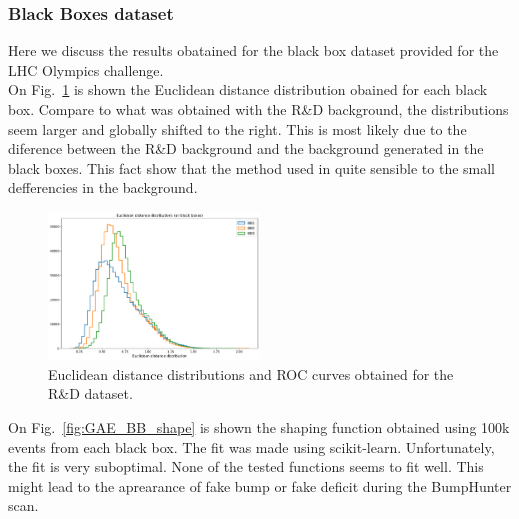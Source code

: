 \documentclass[letterpaper,11pt]{article}
\begin{document}
\subsubsection{Black Boxes dataset}
\label{sec:BB}

\noindent Here we discuss the results obatained for the black box dataset provided for the LHC Olympics challenge.\\

\noindent On Fig.~\ref{fig:GAE_BB_dist} is shown the Euclidean distance distribution obained for each black box.
Compare to what was obtained with the R\&D background, the distributions seem larger and globally shifted to the right.
This is most likely due to the diference between the R\&D background and the background generated in the black boxes.
This fact show that the method used in quite sensible to the small defferencies in the background.

\begin{figure}[h!]
\centering
\includegraphics[width=0.5\textwidth]{img/distance_all.pdf}
\caption{Euclidean distance distributions and ROC curves obtained for the R\&D dataset.}
\label{fig:GAE_BB_dist}
\end{figure}

\noindent On Fig.~\ref{fig:GAE_BB_shape} is shown the shaping function obtained using 100k events from each black box. The fit was made using scikit-learn.
Unfortunately, the fit is very suboptimal. None of the tested functions seems to fit well.
This might lead to the aprearance of fake bump or fake deficit during the BumpHunter scan.
\end{document}
